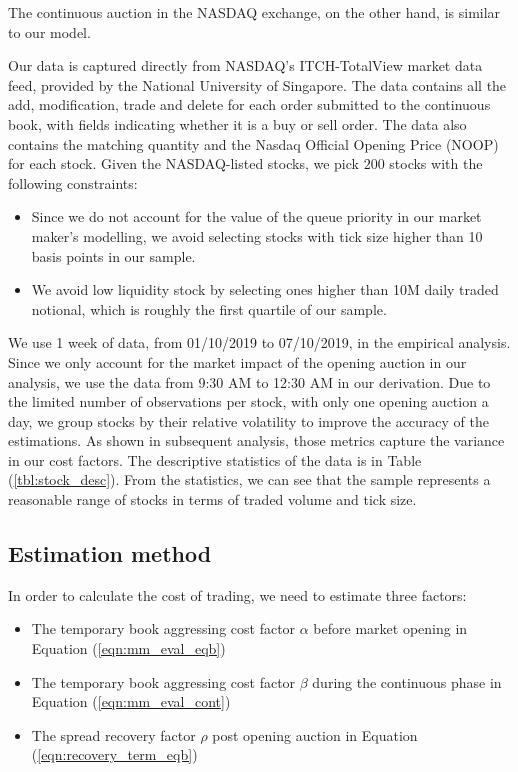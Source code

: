 The continuous auction in the NASDAQ exchange, on the other hand, is similar to our model.

Our data is captured directly from NASDAQ's ITCH-TotalView market data feed, provided by the National University of Singapore. The data contains all the add, modification, trade and delete for each order submitted to the continuous book, with fields indicating whether it is a buy or sell order. The data also contains the matching quantity and the Nasdaq Official Opening Price (NOOP) for each stock. Given the NASDAQ-listed stocks, we pick $200$ stocks with the following constraints:
\begin{itemize}
  \item Since we do not account for the value of the queue priority in our market maker's modelling, we avoid selecting stocks with tick size higher than 10 basis points in our sample.
  \item We avoid low liquidity stock by selecting ones higher than 10M daily traded notional, which is roughly the first quartile of our sample.
\end{itemize}

We use 1 week of data, from 01/10/2019 to 07/10/2019, in the empirical analysis. Since we only account for the market impact of the opening auction in our analysis, we use the data from 9:30 AM to 12:30 AM in our derivation. Due to the limited number of observations per stock, with only one opening auction a day, we group stocks by their relative volatility to improve the accuracy of the estimations. As shown in subsequent analysis, those metrics capture the variance in our cost factors. The descriptive statistics of the data is in Table (\ref{tbl:stock_desc}). From the statistics, we can see that the sample represents a reasonable range of stocks in terms of traded volume and tick size.



\subsection{Estimation method}
In order to calculate the cost of trading, we need to estimate three factors:

\begin{itemize}
  \item The temporary book aggressing cost factor $\alpha$ before market opening in Equation (\ref{eqn:mm_eval_eqb})
  \item The temporary book aggressing cost factor $\beta$ during the continuous phase in Equation (\ref{eqn:mm_eval_cont})
  \item The spread recovery factor $\rho$ post opening auction in Equation (\ref{eqn:recovery_term_eqb})
\end{itemize}

